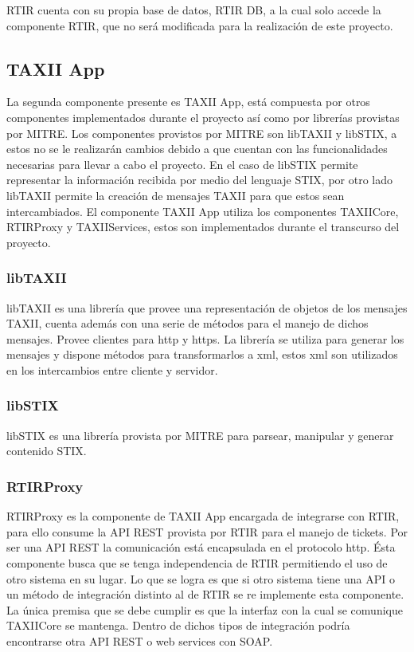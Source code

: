 	RTIR cuenta con su propia base de datos, RTIR DB, a la cual solo accede la componente RTIR, que no será modificada para la realización de este proyecto.
	
	
	\bigskip
	
	\subsection{TAXII App}
	
	\bigskip
	
	La segunda componente presente es TAXII App, está compuesta por otros componentes
		implementados durante el proyecto así como por librerías provistas por MITRE. Los componentes provistos por MITRE son
		libTAXII y libSTIX, a estos no se le realizarán cambios debido a que cuentan con las funcionalidades necesarias para
		llevar a cabo el proyecto. En el caso de libSTIX permite representar la información recibida por medio del lenguaje
		STIX, por otro lado libTAXII permite la creación de mensajes TAXII para que estos sean intercambiados. El componente
		TAXII App utiliza los componentes TAXIICore, RTIRProxy y TAXIIServices, estos son implementados durante el transcurso
		del proyecto.
	
	\subsubsection{libTAXII}
	libTAXII \cite{libtaxii} es una librería que provee una representación de objetos de los mensajes TAXII, cuenta además
		con una serie de métodos para el manejo de dichos mensajes. Provee clientes para http y https. La librería se utiliza
		para generar los mensajes y dispone métodos para transformarlos a xml, estos xml son utilizados en los intercambios
		entre cliente y servidor.
	
	\subsubsection{libSTIX}
	libSTIX es una librería provista por MITRE para parsear, manipular y generar contenido STIX.
	
	\subsubsection{RTIRProxy}
	RTIRProxy es la componente de TAXII App encargada de integrarse con RTIR, para ello consume la
		API REST provista por RTIR para el manejo de tickets. Por ser una API REST la comunicación está encapsulada en el
		protocolo http. Ésta componente busca que se tenga independencia de RTIR permitiendo el uso de otro sistema en su
		lugar. Lo que se logra es que si otro sistema tiene una API
		o un método de integración distinto al de RTIR se re implemente esta componente. La única premisa que se debe cumplir
		es que la interfaz con la cual se comunique TAXIICore se mantenga. Dentro de dichos tipos de integración podría
		encontrarse otra API REST o web services con SOAP.
	
